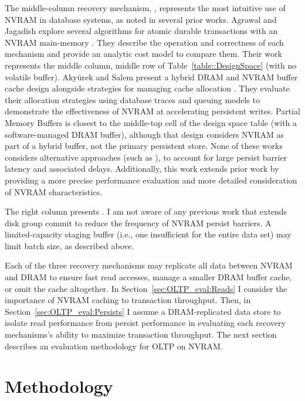 The middle-column recovery mechanism, \InPlace, represents the most intuitive use of NVRAM in database systems, as noted in several prior works.
Agrawal and Jagadish explore several algorithms for atomic durable transactions with an NVRAM main-memory \cite{AgrawalJagadish89}.
They describe the operation and correctness of each mechanism and provide an analytic cost model to compare them.
Their work represents the middle column, middle row of Table~\ref{table::DesignSpace} (\InPlace with no volatile buffer).
Aky\"{u}rek and Salem present a hybrid DRAM and NVRAM buffer cache design alongside strategies for managing cache allocation \cite{SalemAkyrek95}.
They evaluate their allocation strategies using database traces and queuing models to demonstrate the effectiveness of NVRAM at accelerating persistent writes.
Partial Memory Buffers is closest to the middle-top cell of the design space table (\InPlace with a software-managed DRAM buffer), although that design considers NVRAM as part of a hybrid buffer, not the primary persistent store.
None of these works considers alternative approaches (such as \GroupCommit), to account for large persist barrier latency and associated delays.
Additionally, this work extends prior work by providing a more precise performance evaluation and more detailed consideration of NVRAM characteristics.

The right column presents \GroupCommit.
I am not aware of any previous work that extends disk group commit to reduce the frequency of NVRAM persist barriers.
A limited-capacity staging buffer (i.e., one insufficient for the entire data set) may limit batch size, as described above.

Each of the three recovery mechanisms may replicate all data between NVRAM and DRAM to ensure fast read accesses, manage a smaller DRAM buffer cache, or omit the cache altogether.
In Section~\ref{sec:OLTP_eval:Reads} I consider the importance of NVRAM caching to transaction throughput.
Then, in Section~\ref{sec:OLTP_eval:Persists} I assume a DRAM-replicated data store to isolate read performance from persist performance in evaluating each recovery mechanisms's ability to maximize transaction throughput.
The next section describes an evaluation methodology for OLTP on NVRAM.

\section{Methodology}
\label{sec:OLTP_design:Methodology}

